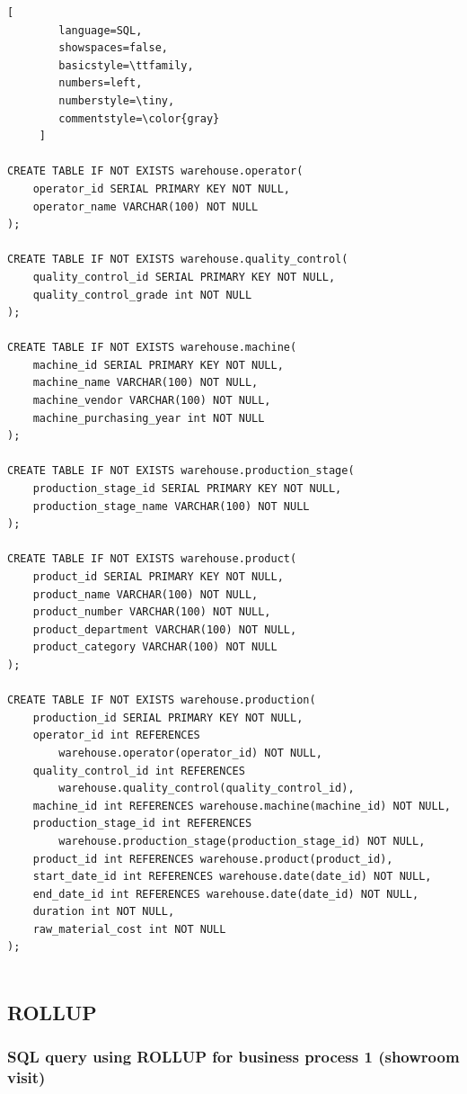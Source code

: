 \documentclass[letterpaper,12pt]{article}
\begin{document}
\begin{lstlisting}[
        language=SQL,
        showspaces=false,
        basicstyle=\ttfamily,
        numbers=left,
        numberstyle=\tiny,
        commentstyle=\color{gray}
     ]
		
CREATE TABLE IF NOT EXISTS warehouse.operator(
  	operator_id SERIAL PRIMARY KEY NOT NULL,
  	operator_name VARCHAR(100) NOT NULL
);

CREATE TABLE IF NOT EXISTS warehouse.quality_control(
  	quality_control_id SERIAL PRIMARY KEY NOT NULL,
  	quality_control_grade int NOT NULL
);

CREATE TABLE IF NOT EXISTS warehouse.machine(
  	machine_id SERIAL PRIMARY KEY NOT NULL,
  	machine_name VARCHAR(100) NOT NULL,
  	machine_vendor VARCHAR(100) NOT NULL,
  	machine_purchasing_year int NOT NULL
);

CREATE TABLE IF NOT EXISTS warehouse.production_stage(
  	production_stage_id SERIAL PRIMARY KEY NOT NULL,
  	production_stage_name VARCHAR(100) NOT NULL
);

CREATE TABLE IF NOT EXISTS warehouse.product(
  	product_id SERIAL PRIMARY KEY NOT NULL,
  	product_name VARCHAR(100) NOT NULL,
  	product_number VARCHAR(100) NOT NULL,
  	product_department VARCHAR(100) NOT NULL,
  	product_category VARCHAR(100) NOT NULL
);

CREATE TABLE IF NOT EXISTS warehouse.production(
	production_id SERIAL PRIMARY KEY NOT NULL,
	operator_id int REFERENCES 
		warehouse.operator(operator_id) NOT NULL,
	quality_control_id int REFERENCES 
		warehouse.quality_control(quality_control_id),
	machine_id int REFERENCES warehouse.machine(machine_id) NOT NULL,
	production_stage_id int REFERENCES 
		warehouse.production_stage(production_stage_id) NOT NULL,
	product_id int REFERENCES warehouse.product(product_id),
	start_date_id int REFERENCES warehouse.date(date_id) NOT NULL,
	end_date_id int REFERENCES warehouse.date(date_id) NOT NULL,
	duration int NOT NULL,
	raw_material_cost int NOT NULL
);		
		
\end{lstlisting}

\subsection{ROLLUP}
\subsubsection{SQL query using ROLLUP for business process 1 (showroom visit)}
\end{document}
